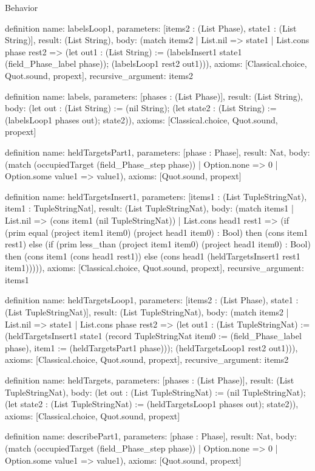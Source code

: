 \begin{lexlean}{Behavior}
\begin{semanticmodule}
definition{
  name: labelsLoop1,
  parameters: [items2 : (List Phase), state1 : (List String)],
  result: (List String),
  body: (match items2
    | List.nil => state1
    | List.cons phase rest2 => (let out1 : (List String) := (labelsInsert1 state1 (field_Phase_label phase)); (labelsLoop1 rest2 out1))),
  axioms: [Classical.choice, Quot.sound, propext],
  recursive_argument: items2
}

definition{
  name: labels,
  parameters: [phases : (List Phase)],
  result: (List String),
  body: (let out : (List String) := (nil String); (let state2 : (List String) := (labelsLoop1 phases out); state2)),
  axioms: [Classical.choice, Quot.sound, propext]
}

definition{
  name: heldTargetsPart1,
  parameters: [phase : Phase],
  result: Nat,
  body: (match (occupiedTarget (field_Phase_step phase))
    | Option.none => 0
    | Option.some value1 => value1),
  axioms: [Quot.sound, propext]
}

definition{
  name: heldTargetsInsert1,
  parameters: [items1 : (List TupleStringNat), item1 : TupleStringNat],
  result: (List TupleStringNat),
  body: (match items1
    | List.nil => (cons item1 (nil TupleStringNat))
    | List.cons head1 rest1 => (if (prim equal (project item1 item0) (project head1 item0) : Bool) then (cons item1 rest1) else (if (prim less_than (project item1 item0) (project head1 item0) : Bool) then (cons item1 (cons head1 rest1)) else (cons head1 (heldTargetsInsert1 rest1 item1))))),
  axioms: [Classical.choice, Quot.sound, propext],
  recursive_argument: items1
}

definition{
  name: heldTargetsLoop1,
  parameters: [items2 : (List Phase), state1 : (List TupleStringNat)],
  result: (List TupleStringNat),
  body: (match items2
    | List.nil => state1
    | List.cons phase rest2 => (let out1 : (List TupleStringNat) := (heldTargetsInsert1 state1 (record TupleStringNat {item0 := (field_Phase_label phase), item1 := (heldTargetsPart1 phase)})); (heldTargetsLoop1 rest2 out1))),
  axioms: [Classical.choice, Quot.sound, propext],
  recursive_argument: items2
}

definition{
  name: heldTargets,
  parameters: [phases : (List Phase)],
  result: (List TupleStringNat),
  body: (let out : (List TupleStringNat) := (nil TupleStringNat); (let state2 : (List TupleStringNat) := (heldTargetsLoop1 phases out); state2)),
  axioms: [Classical.choice, Quot.sound, propext]
}

definition{
  name: describePart1,
  parameters: [phase : Phase],
  result: Nat,
  body: (match (occupiedTarget (field_Phase_step phase))
    | Option.none => 0
    | Option.some value1 => value1),
  axioms: [Quot.sound, propext]
}


\end{semanticmodule}
\end{lexlean}
